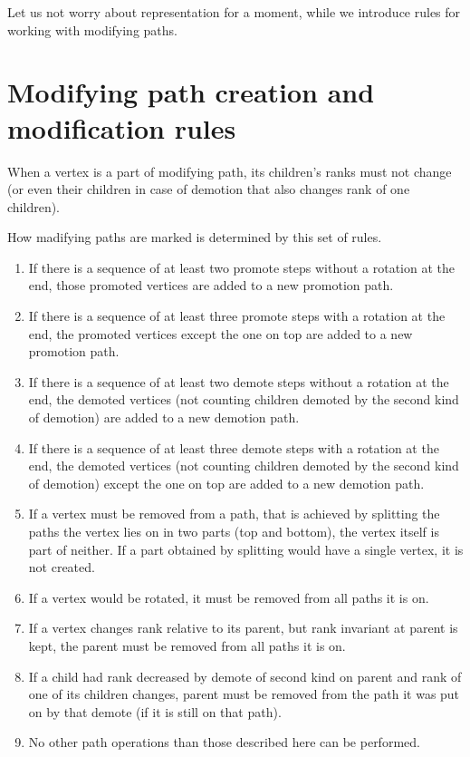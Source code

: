 Let us not worry about representation for a moment, while we introduce rules for working with modifying paths.

\section{Modifying path creation and modification rules}

When a vertex is a part of modifying path, its children's ranks must not change (or even their children in case of demotion that also changes rank of one children). 

How madifying paths are marked is determined by this set of rules.

\begin{enumerate}

\item If there is a sequence of at least two promote steps without a rotation at the end, those promoted vertices are added to a new promotion path. 

\item If there is a sequence of at least three promote steps with a rotation at the end, the promoted vertices except the one on top are added to a new promotion path.

\item If there is a sequence of at least two demote steps without a rotation at the end, the demoted vertices (not counting children demoted by the second kind of demotion) are added to a new demotion path.

\item If there is a sequence of at least three demote steps with a rotation at the end, the demoted vertices (not counting children demoted by the second kind of demotion) except the one on top are added to a new demotion path.

\item If a vertex must be removed from a path, that is achieved by splitting the paths the vertex lies on in two parts (top and bottom), the vertex itself is part of neither. If a part obtained by splitting would have a single vertex, it is not created.

\item If a vertex would be rotated, it must be removed from all paths it is on.

\item If a vertex changes rank relative to its parent, but rank invariant at parent is kept, the parent must be removed from all paths it is on.

\item If a child had rank decreased by demote of second kind on parent and rank of one of its children changes, parent must be removed from the path it was put on by that demote (if it is still on that path).

\item No other path operations than those described here can be performed.

\end{enumerate}

